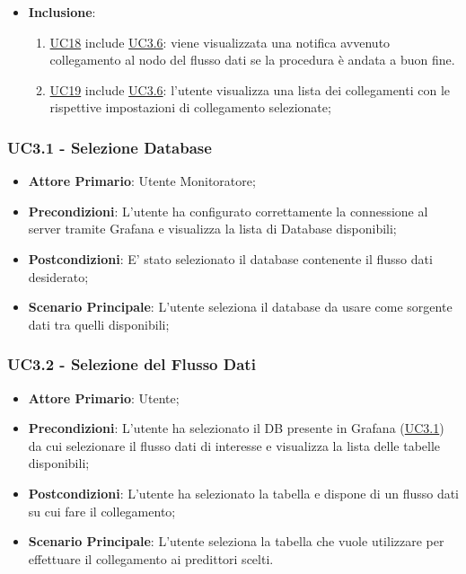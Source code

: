 \begin{itemize}
\begin{enumerate}
				\end{enumerate}
			\item\textbf{Inclusione}:
				\begin{enumerate}
					\item\hyperref[par:UC18]{UC18} include \hyperref[par:UC3.6]{UC3.6}: viene visualizzata una notifica avvenuto collegamento al nodo del flusso dati se la procedura è andata a buon fine.
					\item\hyperref[par:UC19]{UC19} include \hyperref[par:UC3.6]{UC3.6}:  l'utente visualizza una lista dei collegamenti con le rispettive impostazioni di collegamento selezionate;
				\end{enumerate}
		\end{itemize}
		
		\label{par:UC3.1}
		\subsubsection{UC3.1 - Selezione Database}
		\begin{itemize}
			\item\textbf{Attore Primario}: Utente Monitoratore;
			\item\textbf{Precondizioni}: L’utente ha configurato correttamente la connessione al server tramite Grafana e visualizza la lista di Database disponibili;
			\item\textbf{Postcondizioni}: E' stato selezionato il database contenente il flusso dati desiderato;
			\item\textbf{Scenario Principale}: L’utente seleziona il database da usare come sorgente dati tra quelli disponibili;
		\end{itemize}
		
		\label{par:UC3.2}
		\subsubsection{UC3.2 - Selezione del Flusso Dati}
		\begin{itemize}
			\item\textbf{Attore Primario}: Utente;
			\item\textbf{Precondizioni}: L’utente ha selezionato il DB presente in Grafana (\hyperref[par:UC3.1]{UC3.1}) da cui selezionare il flusso dati di interesse e visualizza la lista delle tabelle disponibili;
			\item\textbf{Postcondizioni}: L’utente ha selezionato la tabella e dispone di un flusso dati su cui fare il collegamento;
			\item\textbf{Scenario Principale}: L’utente seleziona la tabella che vuole utilizzare per effettuare il collegamento ai predittori scelti.
		\end{itemize}
		
